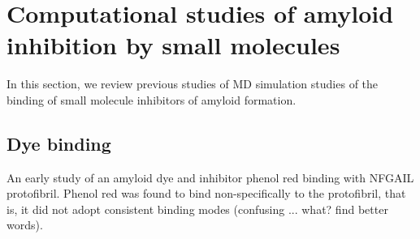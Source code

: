 \section{Computational studies of amyloid inhibition by small molecules}
% 
% 


In this section, we review previous studies of MD simulation studies of the binding of small molecule inhibitors of amyloid formation.

\subsection{Dye binding}

An early study of an amyloid dye and inhibitor phenol red binding with NFGAIL protofibril.\cite{Wu:2006gx} Phenol red was found to bind non-specifically to the protofibril, that is, it did not adopt consistent binding modes (confusing ... what? find better words). %

